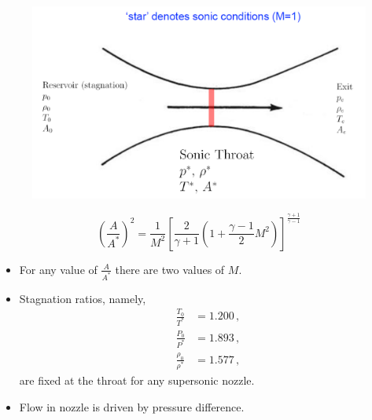 \begin{figure}[H]
    \centering
    \includegraphics[width=1.0\linewidth]{images/throat.png}
\end{figure}
\begin{equation*}
    \left(\frac{A}{A^*}\right)^2 = \frac{1}{M^2}\left[\frac{2}{\gamma+1}\left(1+\frac{\gamma-1}{2}M^2\right)\right]^{\frac{\gamma+1}{\gamma-1}}
\end{equation*}
\begin{itemize}
    \item For any value of $\frac{A}{A^*}$ there are two values of $M$.
    \item Stagnation ratios, namely,
    \begin{align*}
        \frac{T_0}{T^*} &= 1.200 \, , \\
        \frac{P_0}{P^*} &= 1.893 \, , \\
        \frac{\rho_0}{\rho^*} &= 1.577 \, ,
    \end{align*}
    are fixed at the throat for any supersonic nozzle.
    \item {\color{red}Flow in nozzle is driven by pressure difference.}
\end{itemize}


